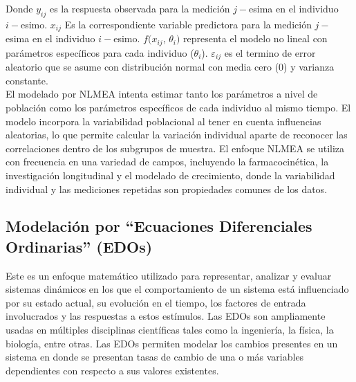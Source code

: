 Donde $y_{ij}$ es la respuesta observada para la medición  $j-$esima en el individuo $i-$esimo. $x_{ij}$ Es la correspondiente variable predictora para la medición $j-$esima en el individuo $i-$esimo. $f(x_{ij}$, $\theta_{i})$ representa el modelo no lineal con parámetros específicos para cada individuo ($\theta_{i}$). $\varepsilon_{ij} $ es el termino de error aleatorio que se asume con distribución normal con media cero (0) y varianza constante.\\


El modelado por NLMEA intenta estimar tanto los parámetros a nivel de población como los parámetros específicos de cada individuo al mismo tiempo. El modelo incorpora la variabilidad poblacional al tener en cuenta influencias aleatorias, lo que permite calcular la variación individual aparte de reconocer las correlaciones dentro de los subgrupos de muestra. El enfoque NLMEA se utiliza con frecuencia en una variedad de campos, incluyendo la farmacocinética, la investigación longitudinal y el modelado de crecimiento, donde la variabilidad individual y las mediciones repetidas son propiedades comunes de los datos.


\subsection{Modelación por ``Ecuaciones Diferenciales Ordinarias'' (EDOs)}\label{EDOlabel}
Este es un enfoque matemático utilizado para representar, analizar y evaluar sistemas dinámicos en los que el comportamiento de un sistema está influenciado por su estado actual, su evolución en el tiempo, los factores de entrada involucrados y las respuestas a estos estímulos. Las EDOs son ampliamente usadas en múltiples disciplinas científicas tales como la ingeniería, la física, la biología, entre otras. Las EDOs permiten modelar los cambios presentes en un sistema en donde se presentan tasas de cambio de una o más variables dependientes con respecto a sus valores existentes.\\

